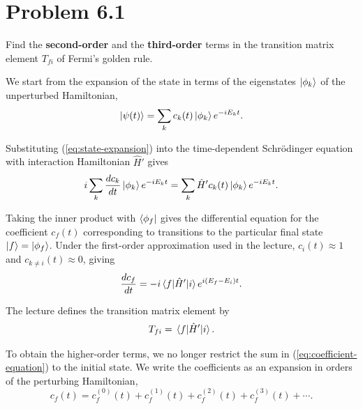 \documentclass[12pt,a4paper]{article}
\begin{document}
	
	\section*{
		Problem 6.1
	}
	\begin{problem}
		Find the \textbf{second-order} and the \textbf{third-order} terms in the 
		transition matrix element $T_{fi}$ of Fermi's golden rule.
	\end{problem}
	\begin{solution_pset}
		\nocite{flores2026}
		We start from the expansion of the state in terms of the eigenstates
		$\ket{\phi_k}$ of the unperturbed Hamiltonian,
		\begin{equation}
			\ket{\psi(t)}
			=
			\sum_k c_k(t)\ket{\phi_k}e^{-iE_k t}.
			\label{eq:state-expansion}
		\end{equation}

		Substituting (\ref{eq:state-expansion}) into the time-dependent Schr\"odinger
		equation with interaction Hamiltonian $\hat H'$ gives
		\begin{equation}
			i\sum_k \dv{c_k}{t}\ket{\phi_k}e^{-iE_k t}
			=
			\sum_k \hat H' c_k(t)\ket{\phi_k}e^{-iE_k t}.
			\label{eq:coefficient-equation}
		\end{equation}

		Taking the inner product with $\bra{\phi_f}$ gives the differential equation
		for the coefficient $c_f(t)$ corresponding to transitions to the particular
		final state $\ket{f}=\ket{\phi_f}$. Under the first-order approximation used
		in the lecture, $c_i(t)\approx 1$ and $c_{k\neq i}(t)\approx 0$, giving
		\begin{equation}
			\dv{c_f}{t}
			=
			-i\matrixel{f}{\hat H'}{i}
			e^{i(E_f-E_i)t}.
			\label{eq:first-order-cf}
		\end{equation}

		The lecture defines the transition matrix element by
		\begin{equation}
			T_{fi}
			=
			\matrixel{f}{\hat H'}{i}.
			\label{eq:Tfi}
		\end{equation}

		To obtain the higher-order terms, we no longer restrict the sum in
		(\ref{eq:coefficient-equation}) to the initial state. We write the coefficients
		as an expansion in orders of the perturbing Hamiltonian,
		\begin{equation}
			c_f(t)
			=
			c_f^{(0)}(t)
			+
			c_f^{(1)}(t)
			+
			c_f^{(2)}(t)
			+
			c_f^{(3)}(t)
			+\cdots.
			\label{eq:coefficient-expansion}
		\end{equation}


\end{solution_pset}
\end{document}
